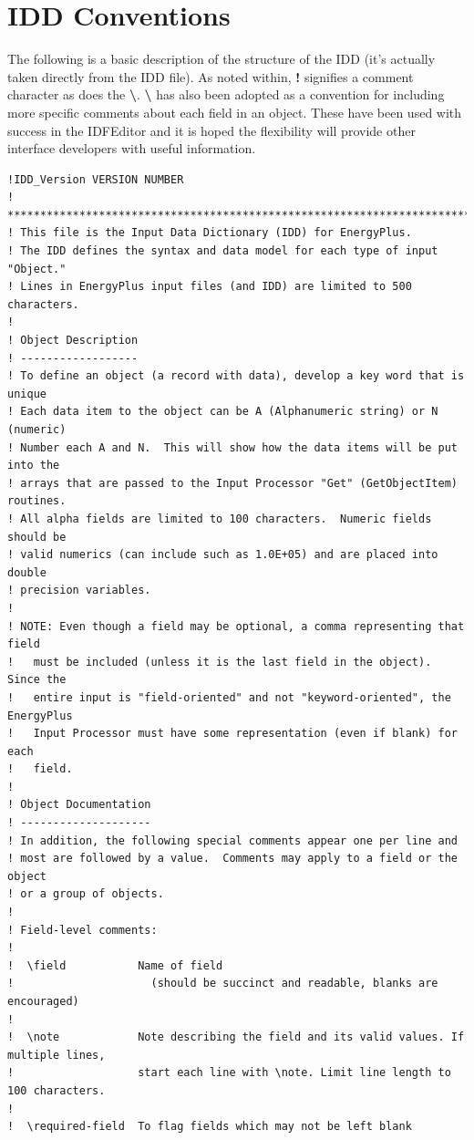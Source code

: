 \section{IDD Conventions}\label{idd-conventions}

The following is a basic description of the structure of the IDD (it's actually taken directly from the IDD file). As noted within, \textbf{!} signifies a comment character as does the \textbf{\textbackslash{}}. \textbf{\textbackslash{}} has also been adopted as a convention for including more specific comments about each field in an object. These have been used with success in the IDFEditor and it is hoped the flexibility will provide other interface developers with useful information.

\begin{lstlisting}
!IDD_Version VERSION NUMBER
! **************************************************************************
! This file is the Input Data Dictionary (IDD) for EnergyPlus.
! The IDD defines the syntax and data model for each type of input "Object."
! Lines in EnergyPlus input files (and IDD) are limited to 500 characters.
!
! Object Description
! ------------------
! To define an object (a record with data), develop a key word that is unique
! Each data item to the object can be A (Alphanumeric string) or N (numeric)
! Number each A and N.  This will show how the data items will be put into the
! arrays that are passed to the Input Processor "Get" (GetObjectItem) routines.
! All alpha fields are limited to 100 characters.  Numeric fields should be
! valid numerics (can include such as 1.0E+05) and are placed into double
! precision variables.
!
! NOTE: Even though a field may be optional, a comma representing that field
!   must be included (unless it is the last field in the object).  Since the
!   entire input is "field-oriented" and not "keyword-oriented", the EnergyPlus
!   Input Processor must have some representation (even if blank) for each
!   field.
!
! Object Documentation
! --------------------
! In addition, the following special comments appear one per line and
! most are followed by a value.  Comments may apply to a field or the object
! or a group of objects.
!
! Field-level comments:
!
!  \field           Name of field
!                     (should be succinct and readable, blanks are encouraged)
!
!  \note            Note describing the field and its valid values. If multiple lines,
!                   start each line with \note. Limit line length to 100 characters.
!
!  \required-field  To flag fields which may not be left blank

\end{lstlisting}
